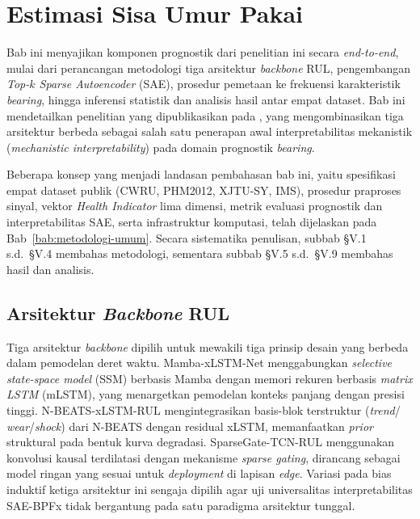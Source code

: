 
\chapter{Estimasi Sisa Umur Pakai}
\label{bab:prognostik}

Bab ini menyajikan {\color{blue}komponen prognostik} dari penelitian ini secara \emph{end-to-end}, 
mulai dari perancangan metodologi tiga arsitektur \emph{backbone} RUL, pengembangan \emph{Top-$k$
Sparse Autoencoder} (SAE), prosedur pemetaan ke frekuensi karakteristik
\emph{bearing}, hingga inferensi statistik dan analisis hasil antar empat dataset.
Bab ini mendetailkan penelitian yang dipublikasikan pada , yang
mengombinasikan tiga arsitektur berbeda sebagai {\color{blue}salah satu
penerapan awal} interpretabilitas mekanistik (\emph{mechanistic
interpretability}) {\color{blue}pada domain prognostik \emph{bearing}}.

Beberapa konsep yang menjadi landasan pembahasan bab ini, yaitu spesifikasi empat dataset
publik (CWRU, PHM2012, XJTU-SY, IMS), prosedur praproses sinyal, vektor
\emph{Health Indicator} lima dimensi, metrik evaluasi prognostik dan
interpretabilitas SAE, serta infrastruktur komputasi, telah dijelaskan pada
Bab~\ref{bab:metodologi-umum}.
Secara sistematika penulisan, subbab §V.1 s.d.\ §V.4 membahas metodologi, sementara subbab §V.5 s.d.\ §V.9
membahas hasil dan analisis.

\section{Arsitektur \emph{Backbone} RUL}
\label{sec:bab5_arsitektur_backbone}

Tiga arsitektur \emph{backbone} dipilih untuk mewakili tiga prinsip desain
yang berbeda dalam pemodelan deret waktu.
Mamba-xLSTM-Net menggabungkan \emph{selective state-space model} (SSM)
berbasis Mamba dengan memori rekuren berbasis \emph{matrix LSTM} (mLSTM),
yang menargetkan pemodelan konteks panjang dengan presisi tinggi.
N-BEATS-xLSTM-RUL mengintegrasikan basis-blok terstruktur (\emph{trend}/
\emph{wear}/\emph{shock}) dari N-BEATS dengan residual xLSTM, memanfaatkan
\emph{prior} struktural pada bentuk kurva degradasi.
SparseGate-TCN-RUL menggunakan konvolusi kausal terdilatasi dengan
mekanisme \emph{sparse gating}, dirancang sebagai model ringan yang sesuai
untuk \emph{deployment} di lapisan \emph{edge}.
Variasi pada {\color{blue}bias induktif} ketiga arsitektur ini sengaja dipilih agar uji
universalitas interpretabilitas SAE-BPFx tidak bergantung pada satu
paradigma arsitektur tunggal.

